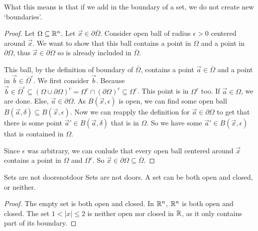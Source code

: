 What this means is that if we add in the boundary of a set, we do not create new `boundaries'.
\begin{proof}
    Let $\Omega\subseteq \mathbb{R}^n$. Let $\vec{x}\in \partial \bar{\Omega}$. Consider open ball of radius $\epsilon>0$ centered around $\vec{x}$. We want to show that this ball contains a point in $\Omega$ and a point in $\partial \Omega$, thus $\vec{x}\in\partial \Omega$ so is already included in $\bar{\Omega}$. 
    
    This ball, by the definition of boundary of $\bar{\Omega}$, contains a point $\vec{a}\in\bar{\Omega}$ and a point in $\vec{b}\in\bar{\Omega}^c$. We first consider $\vec{b}$. Because $\vec{b}\in\bar{\Omega}^c\subseteq (\Omega \cup \partial\Omega)^c = \Omega^c \cap (\partial\Omega)^c\subseteq \Omega^c$. This point is in $\Omega^c$ too.
    If $\vec{a}\in \Omega$, we are done. Else, $\vec{a}\in\partial \Omega$. As $B(\vec{x},\epsilon)$ is open, we can find some open ball $B(\vec{a},\delta)\subseteq B(\vec{x},\epsilon)$. Now we can reapply the definition for $\vec{a}\in\partial \Omega$ to get that there is some point $\vec{a}'\in B(\vec{a},\delta)$ that is in $\Omega$. So we have some $\vec{a}'\in B(\vec{x},\epsilon)$ that is contained in $\Omega$.

    Since $\epsilon$ was arbitrary, we can conlude that every open ball centered around $\vec{x}$ contains a point in $\Omega$ and $\Omega^c$. So $\vec{x}\in\partial \Omega\subseteq \bar{\Omega}$.
\end{proof}
\begin{aproposition}{Sets are not doors}{notdoor}
    Sets are not doors. A set can be both open and closed, or neither.
\end{aproposition}
\begin{proof}
    The empty set is both open and closed. In $\mathbb{R}^n$, $\mathbb{R}^n$ is both open and closed.
    The set $1<|x|\leq 2$ is neither open nor closed in $\mathbb{R}$, as it only contains part of its boundary.
\end{proof}
\exercises
\begin{exerciselist}
    \item \todo
\end{exerciselist}
